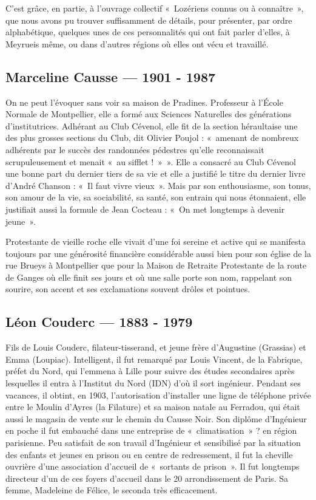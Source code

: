 \label{figuresLocales}

C’est grâce, en partie, à l’ouvrage collectif «~Lozériens connus ou à connaître~», que
nous avons pu trouver suffisamment de détails, pour présenter, par ordre alphabétique,
quelques unes de ces personnalités qui ont fait parler d’elles, à Meyrueis même, ou
dans d’autres régions où elles ont vécu et travaillé.

\subsection{Marceline Causse --- 1901 - 1987}

On ne peut l’évoquer sans voir sa maison de Pradines. Professeur à l’École Normale
de Montpellier, elle a formé aux Sciences Naturelles des générations d’institutrices.
Adhérant au Club Cévenol, elle fit de la section héraultaise une des plus grosses
sections du Club, dit Olivier Poujol : «~amenant de nombreux adhérents par le succès des
randonnées pédestres qu’elle reconnaissait scrupuleusement et menait «~au sifflet !~»~».
Elle a consacré au Club Cévenol une bonne part du dernier tiers de sa vie et elle a justifié le titre du
dernier livre d’André Chanson : «~Il faut vivre vieux~». Mais par son enthousiasme, son tonus, son
amour de la vie, sa sociabilité, sa santé, son entrain qui nous étonnaient, elle justifiait aussi la formule
de Jean Cocteau : «~On met longtemps à devenir jeune~».

Protestante de vieille roche elle vivait d’une foi sereine et active qui se manifesta
toujours par une générosité financière considérable aussi bien pour son église de la
rue Brueys à Montpellier que pour la Maison de Retraite Protestante de la route de
Ganges où elle finit ses jours et où une salle porte son nom, rappelant son sourire,
son accent et ses exclamations souvent drôles et pointues.

\subsection{Léon Couderc --- 1883 - 1979}

Fils de Louis Couderc, filateur-tisserand, et jeune frère d’Augustine (Grassias) et Emma
(Loupiac). Intelligent, il fut remarqué par Louis Vincent, de la Fabrique, préfet du Nord, qui
l’emmena à Lille pour suivre des études secondaires après lesquelles il entra à l’Institut du
Nord (IDN) d’où il sort ingénieur.
Pendant ses vacances, il obtint, en 1903, l’autorisation d’installer une ligne de téléphone
privée entre le Moulin d’Ayres (la Filature) et sa maison natale au Ferradou, qui était aussi le
magasin de vente sur le chemin du Causse Noir.
Son diplôme d’Ingénieur en poche il fut embauché dans une entreprise de «~climatisation~» ?
en région parisienne.
Peu satisfait de son travail d’Ingénieur et sensibilisé par la situation des enfants et jeunes en
prison ou en centre de redressement, il fut la cheville ouvrière d’une association d’accueil de
«~sortants de prison~». Il fut longtemps directeur d’un de ces foyers d’accueil dans le 20\ieme
arrondissement de Paris. Sa femme, Madeleine de Félice, le seconda très efficacement.

